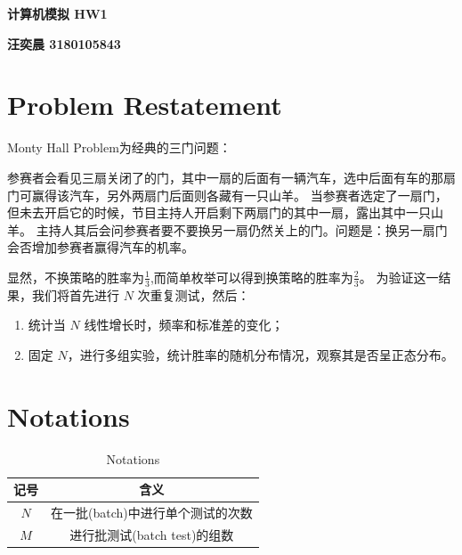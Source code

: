 \documentclass[12pt]{article}
\begin{document}
\pagestyle{fancy}
\setcounter{page}{1}
\vspace{20pt}
\centerline{{\Large \textbf{计算机模拟 HW1}}}
\vspace{15pt}

\centerline{{\large \textbf{汪奕晨 3180105843}}}
\vspace{15pt}

\section{Problem Restatement}
Monty Hall Problem为经典的三门问题：

参赛者会看见三扇关闭了的门，其中一扇的后面有一辆汽车，选中后面有车的那扇门可赢得该汽车，另外两扇门后面则各藏有一只山羊。
当参赛者选定了一扇门，但未去开启它的时候，节目主持人开启剩下两扇门的其中一扇，露出其中一只山羊。
主持人其后会问参赛者要不要换另一扇仍然关上的门。问题是：换另一扇门会否增加参赛者赢得汽车的机率。

显然，不换策略的胜率为$\frac{1}{3}$,而简单枚举可以得到换策略的胜率为$\frac{2}{3}$。
为验证这一结果，我们将首先进行 $N$ 次重复测试，然后：
\begin{enumerate}
\item 统计当 $N$ 线性增长时，频率和标准差的变化；
\item 固定 $N$，进行多组实验，统计胜率的随机分布情况，观察其是否呈正态分布。
\end{enumerate}

\section{Notations}
\begin{table}[H]
  \centering
  \begin{tabular}{cc}
    \hline
    记号 & 含义 \\ \hline
    $N$ &  在一批(batch)中进行单个测试的次数 \\
    $M$ &  进行批测试(batch test)的组数\\ \hline
  \end{tabular}
  \caption{Notations}
  \label{Table Notations}
\end{table}

\end{document}
